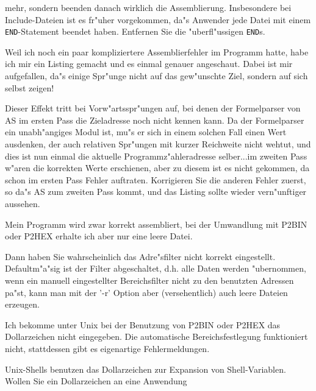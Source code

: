 \documentclass[12pt,a4paper,twoside]{report}
\newcommand{\tty}[1]{{\tt #1}}
\newcommand{\asname}{AS}
\begin{document}
\begin{description}
{          mehr, sondern beenden danach wirklich die Assemblierung.
	  Insbesondere bei Include-Dateien ist es fr"uher vorgekommen, da"s
	  Anwender jede Datei mit einem \tty{END}-Statement beendet haben.
	  Entfernen Sie die "uberfl"ussigen \tty{END}s.}
\vspace{0.3cm}
\item[F:]{Weil ich noch ein paar kompliziertere Assemblierfehler im Programm
          hatte, habe ich mir ein Listing gemacht und es einmal genauer
          angeschaut.  Dabei ist mir aufgefallen, da"s einige Spr"unge nicht
          auf das gew"unschte Ziel, sondern auf sich selbst zeigen!}
\item[A:]{Dieser Effekt tritt bei Vorw"artsspr"ungen auf, bei denen der
          Formelparser von \asname{} im ersten Pass die Zieladresse noch nicht kennen
          kann.  Da der Formelparser ein unabh"angiges Modul ist, mu"s er sich
          in einem solchen Fall einen Wert ausdenken, der auch relativen
          Spr"ungen mit kurzer Reichweite nicht wehtut, und dies ist nun
          einmal die aktuelle Programmz"ahleradresse selber...im zweiten Pass
          w"aren die korrekten Werte erschienen, aber zu diesem ist es nicht
          gekommen, da schon im ersten Pass Fehler auftraten.  Korrigieren
          Sie die anderen Fehler zuerst, so da"s \asname{} zum zweiten Pass kommt,
          und das Listing sollte wieder vern"unftiger aussehen.}
\vspace{0.3cm}
\item[F:]{Mein Programm wird zwar korrekt assembliert, bei der Umwandlung
          mit P2BIN oder P2HEX erhalte ich aber nur eine leere Datei.}
\item[A:]{Dann haben Sie wahrscheinlich das Adre"s\-fil\-ter nicht korrekt
          eingestellt.  De\-faul\-tm"a"sig ist der Filter abgeschaltet, d.h.
          alle Daten werden "ubernommen, wenn ein manuell eingestellter
          Bereichsfilter nicht zu den benutzten Adressen pa"st, kann man
          mit der '-r' Option aber (versehentlich) auch leere Dateien
          erzeugen.}
\vspace{0.3cm}
\item[F:]{Ich bekomme unter Unix bei der Benutzung von P2BIN oder P2HEX
          das Dollarzeichen nicht eingegeben.  Die automatische
          Bereichsfestlegung funktioniert nicht, stattdessen gibt es
          eigenartige Fehlermeldungen.}
\item[A:]{Unix-Shells benutzen das Dollarzeichen zur Expansion von
          Shell-Variablen.  Wollen Sie ein Dollarzeichen an eine Anwendung
}
\end{description}
\end{document}
